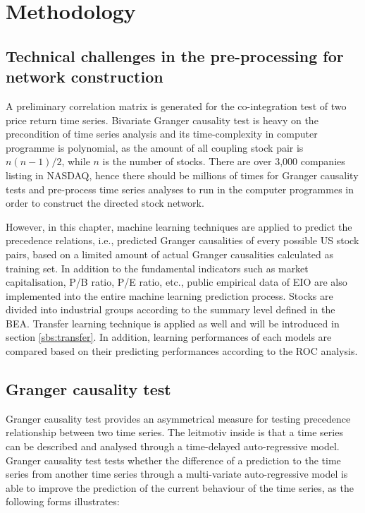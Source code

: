\section{Methodology}
\subsection{Technical challenges in the pre-processing for network construction}
A preliminary correlation matrix is generated for the co-integration test of two price return time series. Bivariate Granger causality test is heavy on the precondition of time series analysis and its time-complexity in computer programme is polynomial, as the amount of all coupling stock pair is $n(n-1)/2$, while $n$ is the number of stocks. There are over 3,000 companies listing in NASDAQ, hence there should be millions of times for Granger causality tests and pre-process time series analyses to run in the computer programmes in order to construct the directed stock network.

However, in this chapter, machine learning techniques are applied to predict the precedence relations, i.e., predicted Granger causalities of every possible US stock pairs, based on a limited amount of actual Granger causalities calculated as training set. In addition to the fundamental indicators such as market capitalisation, P/B ratio, P/E ratio, etc., public empirical data of EIO are also implemented into the entire machine learning prediction process. Stocks are divided into industrial groups according to the summary level defined in the BEA. Transfer learning technique is applied as well and will be introduced in section \ref{sbs:transfer}. In addition, learning performances of each models are compared based on their predicting performances according to the ROC analysis.

\subsection{Granger causality test}
Granger causality test \cite{granger1969investigating} provides an asymmetrical measure for testing precedence relationship between two time series. The leitmotiv inside is that a time series can be described and analysed through a time-delayed auto-regressive model. Granger causality test tests whether the difference of a prediction to the time series from another time series through a multi-variate auto-regressive model is able to improve the prediction of the current behaviour of the time series, as the following forms illustrates:

